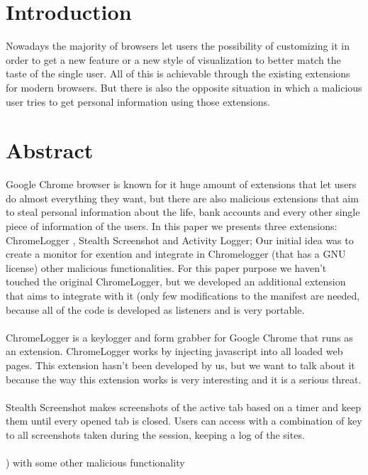 \documentclass[12pt]{article}
\begin{document}
\begin{multicols}{2}
	\section*{Introduction}
	Nowadays the majority of browsers let users the possibility of customizing it in order to get a new feature or a new style of visualization to better match the taste of the single user.
	All of this is achievable through the existing extensions for modern browsers. But there is also the opposite situation in which a malicious user tries to get personal information using those extensions.
	
	\section*{Abstract}
	Google Chrome browser is known for it huge amount of extensions that let users do almost everything they want, but there are also malicious extensions that aim to steal personal information about the life, bank accounts and every other single piece of information of the users. In this paper we presents three extensions: ChromeLogger \cite{ChromeLogger}, Stealth Screenshot and Activity Logger;
	Our initial idea was to create a monitor for exention and integrate in Chromelogger (that has a GNU license) other malicious functionalities. For this paper purpose we haven't touched the original ChromeLogger, but we developed an additional extension that aims to integrate with it (only few modifications to the manifest are needed, because all of the code is developed as listeners and is very portable.
	\paragraph{}ChromeLogger is a keylogger and form grabber for Google Chrome that runs as an extension.	
	ChromeLogger works by injecting javascript into all loaded web pages. This extension hasn't been developed by us, but we want to talk about it because the way this extension works is very interesting and it is a serious threat.
	\paragraph{}Stealth Screenshot makes screenshots of the active tab based on a timer and keep them until every opened tab is closed. Users can access with a combination of key to all screenshots taken during the session, keeping a log of the sites.\paragraph{} \cite{ChromeLogger}) with some other malicious functionality

\end{multicols}
\end{document}
